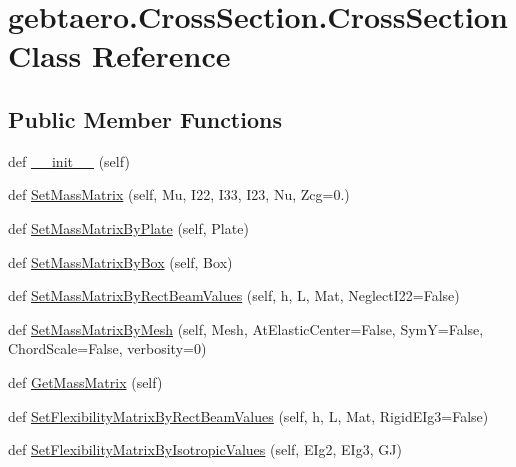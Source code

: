 \hypertarget{classgebtaero_1_1_cross_section_1_1_cross_section}{}\section{gebtaero.\+Cross\+Section.\+Cross\+Section Class Reference}
\label{classgebtaero_1_1_cross_section_1_1_cross_section}
\subsection*{Public Member Functions}
\begin{DoxyCompactItemize}
\item 
def \hyperlink{classgebtaero_1_1_cross_section_1_1_cross_section_a26142f8a77b098b8725d7d024cfd5199}{\+\_\+\+\_\+init\+\_\+\+\_\+} (self)
\item 
def \hyperlink{classgebtaero_1_1_cross_section_1_1_cross_section_a09866889e6a297e305d32daa5d57e1cb}{Set\+Mass\+Matrix} (self, Mu, I22, I33, I23, Nu, Zcg=0.)
\item 
def \hyperlink{classgebtaero_1_1_cross_section_1_1_cross_section_a0e87dd20eeef95c96cbbeebc0491fe86}{Set\+Mass\+Matrix\+By\+Plate} (self, Plate)
\item 
def \hyperlink{classgebtaero_1_1_cross_section_1_1_cross_section_a4914caf35d9b8cfadafe8e359a590d7c}{Set\+Mass\+Matrix\+By\+Box} (self, Box)
\item 
def \hyperlink{classgebtaero_1_1_cross_section_1_1_cross_section_a7fa57a9ed49c1029409a78f45a45c562}{Set\+Mass\+Matrix\+By\+Rect\+Beam\+Values} (self, h, L, Mat, Neglect\+I22=False)
\item 
def \hyperlink{classgebtaero_1_1_cross_section_1_1_cross_section_a51f5f560da9f747310ebc55db72fd353}{Set\+Mass\+Matrix\+By\+Mesh} (self, Mesh, At\+Elastic\+Center=False, SymY=False, Chord\+Scale=False, verbosity=0)
\item 
def \hyperlink{classgebtaero_1_1_cross_section_1_1_cross_section_a329e4ccf313b33bf8fd5a1af65d95d0f}{Get\+Mass\+Matrix} (self)
\item 
def \hyperlink{classgebtaero_1_1_cross_section_1_1_cross_section_ae470ab0c1773947882a762c5e36351d5}{Set\+Flexibility\+Matrix\+By\+Rect\+Beam\+Values} (self, h, L, Mat, Rigid\+E\+Ig3=False)
\item 
def \hyperlink{classgebtaero_1_1_cross_section_1_1_cross_section_a8e1902ba4dd5fbdb184868b55b663ebc}{Set\+Flexibility\+Matrix\+By\+Isotropic\+Values} (self, E\+Ig2, E\+Ig3, GJ)
\item 

\end{DoxyCompactItemize}
